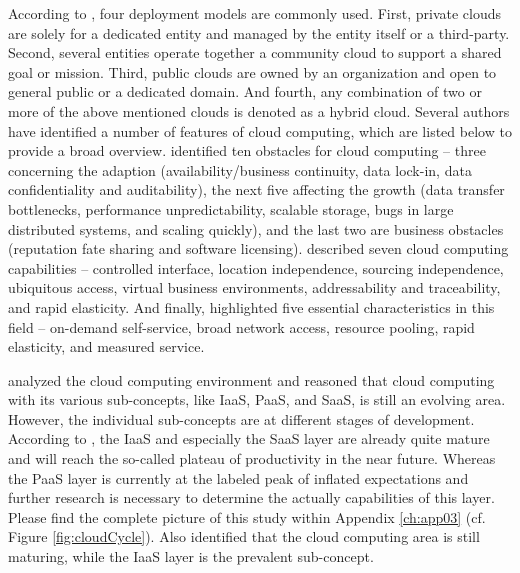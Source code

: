 According to \citet[p. 3]{Mell2011}, four deployment models are commonly used. First, private clouds are solely for a dedicated entity and managed by the entity itself or a third-party. Second, several entities operate together a community cloud to support a shared goal or mission. Third, public clouds are owned by an organization and open to general public or a dedicated domain. And fourth, any combination of two or more of the above mentioned clouds is denoted as a hybrid cloud.
Several authors have identified a number of features of cloud computing, which are listed below to provide a broad overview. \citet[pp. 54-58]{Armbrust2010} identified ten obstacles for cloud computing -- three concerning the adaption (availability/business continuity, data lock-in, data confidentiality and auditability), the next five affecting the growth (data transfer bottlenecks, performance unpredictability, scalable storage, bugs in large distributed systems, and scaling quickly), and the last two are business obstacles (reputation fate sharing and software licensing). \citet[pp. 120-127]{Iyer2010} described seven cloud computing capabilities -- controlled interface, location independence, sourcing independence, ubiquitous access, virtual business environments, addressability and traceability, and rapid elasticity. And finally, \citet[p. 2]{Mell2011} highlighted five essential characteristics in this field -- on-demand self-service, broad network access, resource pooling, rapid elasticity, and measured service. 

\citet{Smith2012} analyzed the cloud computing environment and reasoned that cloud computing with its various sub-concepts, like \ac{IaaS}, \ac{PaaS}, and \ac{SaaS}, is still an evolving area. However, the individual sub-concepts are at different stages of development. According to \citet[p. 5]{Smith2012}, the \ac{IaaS} and especially the \ac{SaaS} layer are already quite mature and will reach the so-called plateau of productivity in the near future. Whereas the \ac{PaaS} layer is currently at the labeled peak of inflated expectations and further research is necessary to determine the actually capabilities of this layer. Please find the complete picture of this study within Appendix \ref{ch:app03} (cf. Figure \ref{fig:cloudCycle}). Also \citet[p. 120]{Iyer2010} identified that the cloud computing area is still maturing, while the \ac{IaaS} layer is the prevalent sub-concept.

